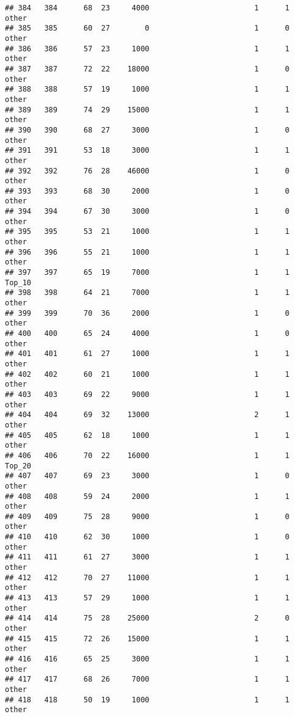 \documentclass[
]{article}
\begin{document}
\begin{verbatim}
## 384   384      68  23     4000                        1      1    other
## 385   385      60  27        0                        1      0    other
## 386   386      57  23     1000                        1      1    other
## 387   387      72  22    18000                        1      0    other
## 388   388      57  19     1000                        1      1    other
## 389   389      74  29    15000                        1      1    other
## 390   390      68  27     3000                        1      0    other
## 391   391      53  18     3000                        1      1    other
## 392   392      76  28    46000                        1      0    other
## 393   393      68  30     2000                        1      0    other
## 394   394      67  30     3000                        1      0    other
## 395   395      53  21     1000                        1      1    other
## 396   396      55  21     1000                        1      1    other
## 397   397      65  19     7000                        1      1   Top_10
## 398   398      64  21     7000                        1      1    other
## 399   399      70  36     2000                        1      0    other
## 400   400      65  24     4000                        1      0    other
## 401   401      61  27     1000                        1      1    other
## 402   402      60  21     1000                        1      1    other
## 403   403      69  22     9000                        1      1    other
## 404   404      69  32    13000                        2      1    other
## 405   405      62  18     1000                        1      1    other
## 406   406      70  22    16000                        1      1   Top_20
## 407   407      69  23     3000                        1      0    other
## 408   408      59  24     2000                        1      1    other
## 409   409      75  28     9000                        1      0    other
## 410   410      62  30     1000                        1      0    other
## 411   411      61  27     3000                        1      1    other
## 412   412      70  27    11000                        1      1    other
## 413   413      57  29     1000                        1      1    other
## 414   414      75  28    25000                        2      0    other
## 415   415      72  26    15000                        1      1    other
## 416   416      65  25     3000                        1      1    other
## 417   417      68  26     7000                        1      1    other
## 418   418      50  19     1000                        1      1    other

\end{verbatim}
\end{document}
